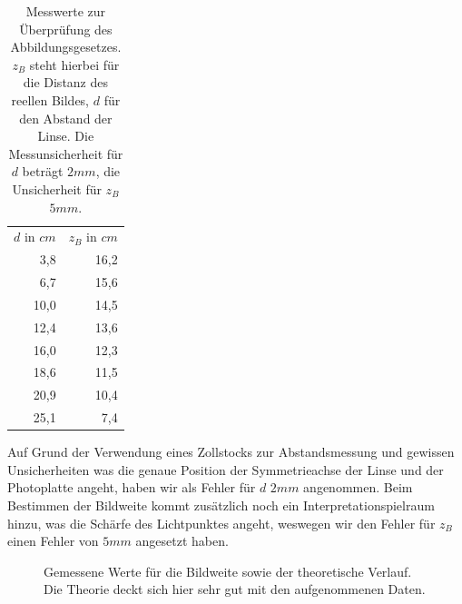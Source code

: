 \documentclass[bigchapter,colorback,accentcolor=tud4b,linedtoc,11pt]{tudreport}
\begin{document}
\begin{table}[H]
  \begin{center}
  \begin{tabular}{r|r}
    $d$ in $cm$ & $z_B$ in $cm$ \\ \hhline{=|=}
    3,8         & 16,2          \\ \hline
    6,7         & 15,6          \\ \hline
    10,0        & 14,5          \\ \hline
    12,4        & 13,6          \\ \hline
    16,0        & 12,3          \\ \hline
    18,6        & 11,5          \\ \hline
    20,9        & 10,4          \\ \hline
    25,1        & 7,4           \\
	\end{tabular}
    \caption{Messwerte zur Überprüfung des Abbildungsgesetzes. $z_B$ steht
      hierbei für die Distanz des reellen Bildes, $d$ für den Abstand der
      Linse. Die Messunsicherheit für $d$ beträgt $2mm$, die Unsicherheit für
      $z_B$ $5mm$.}
  \end{center}
\end{table}

Auf Grund der Verwendung eines Zollstocks zur Abstandsmessung und gewissen
Unsicherheiten was die genaue Position der Symmetrieachse der Linse und der
Photoplatte angeht, haben wir als Fehler für $d$ $2 mm$ angenommen. Beim
Bestimmen der Bildweite kommt zusätzlich noch ein Interpretationspielraum
hinzu, was die Schärfe des Lichtpunktes angeht, weswegen wir den Fehler für
$z_B$ einen Fehler von $5mm$ angesetzt haben.

\begin{figure}[H]
    \caption{Gemessene Werte für die Bildweite sowie der theoretische
      Verlauf. Die Theorie deckt sich hier sehr gut mit den
      aufgenommenen Daten.}
\end{figure}
\end{document}
